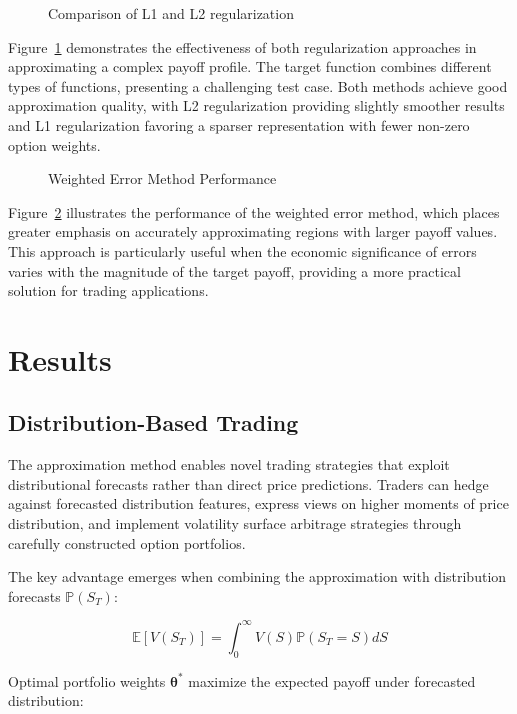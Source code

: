 \documentclass[12pt]{article}
\begin{document}
\begin{figure}[htbp]
\centering

\caption{Comparison of L1 and L2 regularization}
\label{fig:regularization}
\end{figure}

Figure~\ref{fig:regularization} demonstrates the effectiveness of both regularization 
approaches in approximating a complex payoff profile. The target function combines 
different types of functions, presenting a challenging test case. Both 
methods achieve good approximation quality, with L2 regularization providing slightly 
smoother results and L1 regularization favoring a sparser representation with fewer 
non-zero option weights.

\begin{figure}[htbp]
\centering

\caption{Weighted Error Method Performance}
\label{fig:weighted}
\end{figure}

Figure~\ref{fig:weighted} illustrates the performance of the weighted error method, 
which places greater emphasis on accurately approximating regions with larger payoff 
values. This approach is particularly useful when the economic significance of errors 
varies with the magnitude of the target payoff, providing a more practical solution 
for trading applications.

\section{Results}
\subsection{Distribution-Based Trading}
The approximation method enables novel trading strategies that exploit distributional 
forecasts rather than direct price predictions. Traders can hedge against forecasted 
distribution features, express views on higher moments of price distribution, and 
implement volatility surface arbitrage strategies through carefully constructed 
option portfolios.

The key advantage emerges when combining the approximation with distribution 
forecasts $\mathbb{P}(S_T)$:
 
\begin{equation}
\mathbb{E}[V(S_T)] = 
    \int_{0}^{\infty} 
        V(S) \mathbb{P}(S_T = S) dS
\end{equation}

Optimal portfolio weights $\boldsymbol{\theta}^*$ maximize the expected payoff under 
forecasted distribution:
\end{document}
